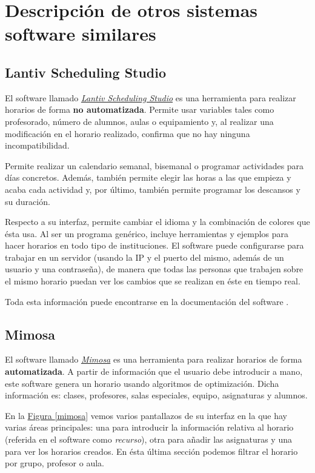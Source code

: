 \chapter{Descripción de otros sistemas software similares}

\section{Lantiv Scheduling Studio}

El software llamado \href{http://www.schedulingstudio.com/}{\textit{Lantiv Scheduling Studio}} es una herramienta para realizar horarios de forma \textbf{no automatizada}. Permite usar variables tales como profesorado, número de alumnos, aulas o equipamiento y, al realizar una modificación en el horario realizado, confirma que no hay ninguna incompatibilidad.

Permite realizar un calendario semanal, bisemanal o programar actividades para días concretos. Además, también permite elegir las horas a las que empieza y acaba cada actividad y, por último, también permite programar los descansos y su duración.

Respecto a su interfaz, permite cambiar el idioma y la combinación de colores que ésta usa. Al ser un programa genérico, incluye herramientas y ejemplos para hacer horarios en todo tipo de instituciones. El software puede configurarse para trabajar en un servidor (usando la IP y el puerto del mismo, además de un usuario y una contraseña), de manera que todas las personas que trabajen sobre el mismo horario puedan ver los cambios que se realizan en éste en tiempo real.

Toda esta información puede encontrarse en la documentación del software \cite{lantiv}.

\section{Mimosa}

El software llamado \href{http://www.mimosasoftware.com/}{\textit{Mimosa}} es una herramienta para realizar horarios de forma \textbf{automatizada}. A partir de información que el usuario debe introducir a mano, este software genera un horario usando algoritmos de optimización. Dicha información es: clases, profesores, salas especiales, equipo, asignaturas y alumnos. 

En la \hyperref[mimosa]{Figura \ref*{mimosa}} vemos varios pantallazos de su interfaz en la que hay varias áreas principales: una para introducir la información relativa al horario (referida en el software como \textit{recurso}), otra para añadir las asignaturas y una para ver los horarios creados. En ésta última sección podemos filtrar el horario por grupo, profesor o aula.

